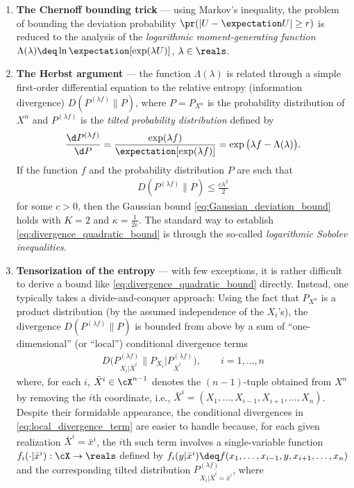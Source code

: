 \documentclass{article}
\theoremstyle{plain}
\begin{document}
\begin{enumerate}
	\item {\bf The Chernoff bounding trick} --- using Markov's inequality, the problem of bounding the deviation probability $\pr (|U - \expectation U| \ge r)$ is reduced to the analysis of the {\em logarithmic moment-generating function} $\Lambda(\lambda) \deq \ln \expectation[\exp(\lambda U)]$, $\lambda \in \reals$.
	\item {\bf The Herbst argument} --- the function $\Lambda(\lambda)$ is related through a simple first-order differential equation to the relative entropy (information divergence) $D(P^{(\lambda f)} \| P)$, where $P = P_{X^n}$ is the probability distribution of $X^n$ and $P^{(\lambda f)}$ is the {\em tilted probability distribution} defined by
	\begin{align}\label{eq:tilted_distribution}
		\frac{\d P^{(\lambda f)}}{\d P} = \frac{\exp(\lambda f)}{\expectation[\exp(\lambda f)]} = \exp\big(\lambda f - \Lambda(\lambda)\big).
		\end{align}
If the function $f$ and the probability distribution $P$ are such that
\begin{align}\label{eq:divergence_quadratic_bound}
D(P^{(\lambda f)} \| P) \le \frac{c\lambda^2}{2}
\end{align}
for some $c > 0$, then the Gaussian bound \eqref{eq:Gaussian_deviation_bound} holds with $K = 2$ and $\kappa = \frac{1}{2c}$. The standard way to establish  \eqref{eq:divergence_quadratic_bound} is through the so-called {\em logarithmic Sobolev inequalities}.
\item {\bf Tensorization of the entropy} --- with few exceptions, it is rather difficult to derive a bound like \eqref{eq:divergence_quadratic_bound} directly. Instead, one typically takes a divide-and-conquer approach: Using the fact that $P_{X^n}$ is a product distribution (by the assumed independence of the $X_i$'s), the divergence $D(P^{(\lambda f)} \| P)$ is bounded from above by a sum of ``one-dimensional'' (or ``local'') conditional divergence terms
\begin{align}\label{eq:local_divergence_term}
D\Big(P^{(\lambda f)}_{X_i|\bar{X}^i} \big\| P_{X_i} \big| P^{(\lambda f)}_{\bar{X}^i} \Big),
\qquad i = 1,\ldots, n
\end{align}
where, for each $i$, $\bar{X}^i \in \cX^{n-1}$ denotes the $(n-1)$-tuple obtained from $X^n$ by removing the $i$th coordinate, i.e., $\bar{X}^i = (X_1,\ldots,X_{i-1},X_{i+1},\ldots,X_n)$. Despite their formidable appearance, the conditional divergences in \eqref{eq:local_divergence_term} are easier to handle because, for each given realization $\bar{X}^i = \bar{x}^i$, the $i$th such term involves a single-variable function $f_i(\cdot|\bar{x}^i) : \cX \to \reals$ defined by $f_i(y|\bar{x}^i) \deq f(x_1,\ldots,x_{i-1},y,x_{i+1},\ldots,x_n)$ and the corresponding tilted distribution $P^{(\lambda f)}_{X_i|\bar{X}^i = \bar{x}^i}$, where

\end{enumerate}
\end{document}
